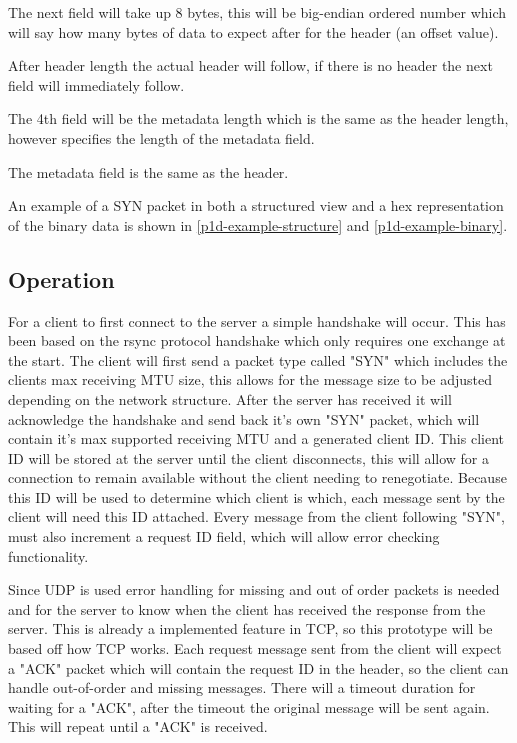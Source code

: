 The next field will take up 8 bytes, this will be big-endian ordered number which will say how many bytes of data to expect after for the header (an offset value).

After header length the actual header will follow, if there is no header the next field will immediately follow.

The 4th field will be the metadata length which is the same as the header length, however specifies the length of the metadata field.

The metadata field is the same as the header.

An example of a SYN packet in both a structured view and a hex representation of the binary data is shown in \ref{p1d-example-structure} and \ref{p1d-example-binary}.

\subsection*{Operation}
For a client to first connect to the server a simple handshake will occur. This has been based on the rsync protocol handshake which only requires one exchange at the start. The client will first send a packet type called "SYN" which includes the clients max receiving MTU size, this allows for the message size to be adjusted depending on the network structure. After the server has received it will acknowledge the handshake and send back it's own "SYN" packet, which will contain it's max supported receiving MTU and a generated client ID. This client ID will be stored at the server until the client disconnects, this will allow for a connection to remain available without the client needing to renegotiate. Because this ID will be used to determine which client is which, each message sent by the client will need this ID attached. Every message from the client following "SYN", must also increment a request ID field, which will allow error checking functionality.

Since UDP is used error handling for missing and out of order packets is needed and for the server to know when the client has received the response from the server. This is already a implemented feature in TCP, so this prototype will be based off how TCP works. Each request message sent from the client will expect a "ACK" packet which will contain the request ID in the header, so the client can handle out-of-order and missing messages. There will a timeout duration for waiting for a "ACK", after the timeout the original message will be sent again. This will repeat until a "ACK" is received.

